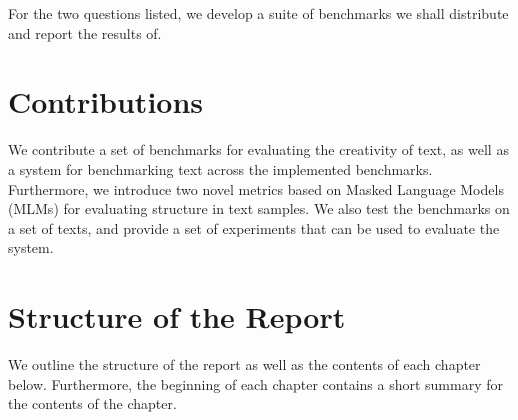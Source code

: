 For the two questions listed, we develop a suite of benchmarks we shall distribute and report the results of. 

\section{Contributions}

We contribute a set of benchmarks for evaluating the creativity of text, as well as a system for benchmarking text across the implemented benchmarks. Furthermore, we introduce two novel metrics based on Masked Language Models (MLMs) for evaluating structure in text samples. We also test the benchmarks on a set of texts, and provide a set of experiments that can be used to evaluate the system.


\section{Structure of the Report}
We outline the structure of the report as well as the contents of each chapter below. Furthermore, the beginning of each chapter contains a short summary for the contents of the chapter.

